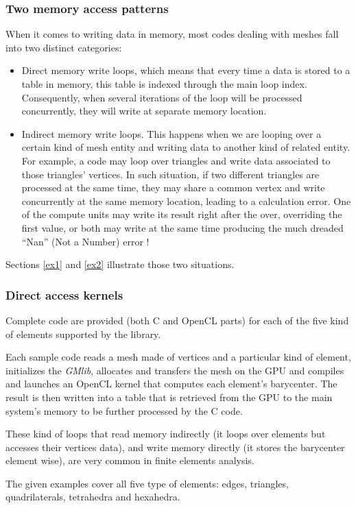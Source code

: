 \documentclass[a4paper,12pt]{article}
\begin{document}
\subsubsection*{Two memory access patterns}
When it comes to writing data in memory, most codes dealing with meshes fall into two distinct categories:
\begin{itemize}
\item Direct memory write loops, which means that every time a data is stored to a table in memory, this table is indexed through the main loop index. Consequently, when several iterations of the loop will be processed concurrently, they will write at separate memory location.
\item Indirect memory write loops. This happens when we are looping over a certain kind of mesh entity and writing data to another kind of related entity. For example, a code may loop over triangles and write data associated to those triangles' vertices. In such situation, if two different triangles are processed at the same time, they may share a common vertex and write concurrently at the same memory location, leading to a calculation error. One of the compute units may write its result right after the over, overriding the first value, or both may write at the same time producing the much dreaded ``Nan'' (Not a Number) error !
\end{itemize}

Sections \ref{ex1} and \ref{ex2} illustrate those two situations.

\subsubsection*{Direct access kernels}
Complete code are provided (both C and OpenCL parts) for each of the five kind of elements supported by the library.

Each sample code reads a mesh made of vertices and a particular kind of element, initializes the \emph{GMlib}, allocates and transfers the mesh on the GPU and compiles and launches an OpenCL kernel that computes each element's barycenter. The result is then written into a table that is retrieved from the GPU to the main system's memory to be further processed by the C code.

These kind of loops that read memory indirectly (it loops over elements but accesses their vertices data), and write memory directly (it stores the barycenter element wise), are very common in finite elements analysis.

The given examples cover all five type of elements: edges, triangles, quadrilaterals, tetrahedra and hexahedra.
\end{document}
